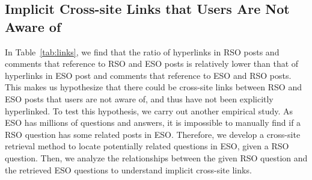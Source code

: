 \subsection{Implicit Cross-site Links that Users Are Not Aware of}
\label{sec:implicitLink}
In Table~\ref{tab:links}, we find that the ratio of hyperlinks in RSO posts and comments that reference to RSO and ESO posts is relatively lower than that of hyperlinks in ESO post and comments that reference to ESO and RSO posts.
This makes us hypothesize that there could be cross-site links between RSO and ESO posts that users are not aware of, and thus have not been explicitly hyperlinked.
To test this hypothesis, we carry out another empirical study. 
As ESO has millions of questions and answers, it is impossible to manually find if a RSO question has some related posts in ESO.
Therefore, we develop a cross-site retrieval method to locate potentially related questions in ESO, given a RSO question.
Then, we analyze the relationships between the given RSO question and the retrieved ESO questions to understand implicit cross-site links.


